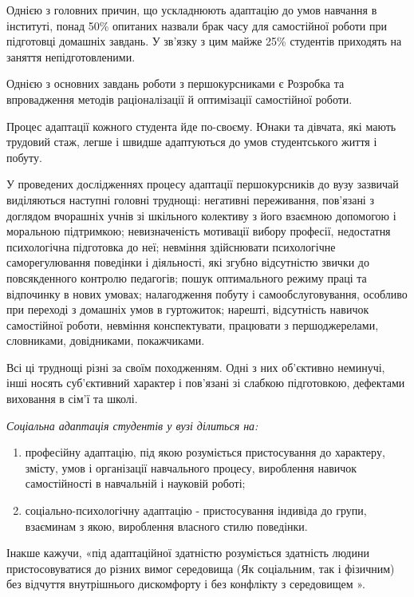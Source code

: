 \documentclass[a4paper,12pt, titlepage]{article}
\begin{document}
    Однією з головних причин, що ускладнюють адаптацію до умов
    навчання в інституті, понад 50\% опитаних назвали брак часу
    для самостійної роботи при підготовці домашніх завдань. У зв'язку з
    цим майже 25\% студентів приходять на заняття непідготовленими.

    Однією з основних завдань роботи з першокурсниками є
    Розробка та впровадження методів раціоналізації й оптимізації
    самостійної роботи.

    Процес адаптації кожного студента йде по-своєму. Юнаки та
    дівчата, які мають трудовий стаж, легше і швидше адаптуються до умов
    студентського життя і побуту.

    У проведених дослідженнях процесу адаптації першокурсників до
    вузу зазвичай виділяються наступні головні труднощі: негативні
    переживання, пов'язані з доглядом вчорашніх учнів зі шкільного
    колективу з його взаємною допомогою і моральною підтримкою;
    невизначеність мотивації вибору професії, недостатня
    психологічна підготовка до неї; невміння здійснювати психологічне
    саморегулювання поведінки і діяльності, які згубно відсутністю
    звички до повсякденного контролю педагогів; пошук оптимального
    режиму праці та відпочинку в нових умовах; налагодження побуту і
    самообслуговування, особливо при переході з домашніх умов в
    гуртожиток; нарешті, відсутність навичок самостійної роботи, невміння
    конспектувати, працювати з першоджерелами, словниками, довідниками,
    покажчиками.

    Всі ці труднощі різні за своїм походженням. Одні з них
    об'єктивно неминучі, інші носять суб'єктивний характер і пов'язані зі
    слабкою підготовкою, дефектами виховання в сім'ї та школі.

    \textit{Соціальна адаптація студентів у вузі ділиться на:}
    \begin{enumerate}
        \item професійну адаптацію, під якою розуміється
        пристосування до характеру, змісту, умов і організації навчального
        процесу, вироблення навичок самостійності в навчальній і науковій
        роботі;
        \item соціально-психологічну адаптацію - пристосування індивіда
        до групи, взаєминам з якою, вироблення власного стилю
        поведінки.
    \end{enumerate}
    Інакше кажучи, «під адаптаційної здатністю розуміється
    здатність людини пристосовуватися до різних вимог середовища
    (Як соціальним, так і фізичним) без відчуття внутрішнього
    дискомфорту і без конфлікту з середовищем ».
\end{document}
